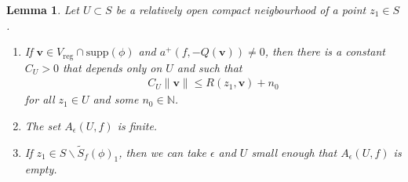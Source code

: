 \documentclass[twoside,a4paper,10pt]{article} %
\newcommand{\8}{\infty}
\newcommand{\NN}{\mathbb{N}}
\newcommand{\vbf}{\mathbf{v}}
\newcommand{\Stil}{\widetilde{S}}
\newcommand{\reg}{\mathrm{reg}}
\newcommand{\supp}{\mathrm{supp}}
\theoremstyle{mytheoremstyle}
\newtheorem{lem}[thm]{Lemma}
\theoremstyle{remark}
\numberwithin{equation}{section}
\begin{document}
\begin{lem} \label{lemAU} Let $U \subset S$ be a relatively open compact neigbourhood of a point $z_1 \in S$.
\begin{enumerate}
\item If $\vbf \in V_\reg \cap \supp(\phi)$ and $a^+(f,-Q(\vbf)) \neq 0$, then there is a constant $C_U>0$ that depends only on $U$ and such that
\begin{align}
C_U\lVert \vbf \rVert \leq R(z_1,\vbf)+n_0
\end{align}
for all $z_1 \in U$ and some $n_0 \in \NN$.
\item The set $A_\epsilon(U,f)$ is finite. 
\item If $z_1 \in S \smallsetminus \Stil_f(\phi)_1$, then we can take $\epsilon$ and $U$ small enough that $A_\epsilon(U,f)$ is empty.
\end{enumerate}
\end{lem}
\end{document}
